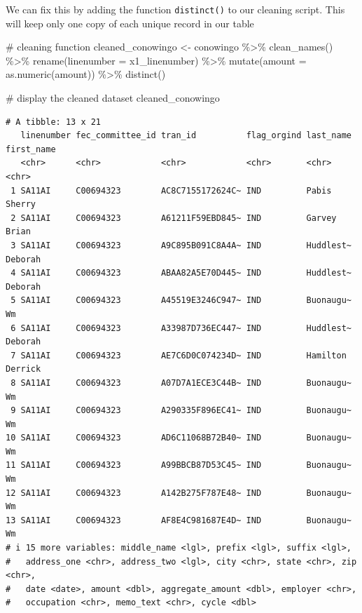 \documentclass[
  letterpaper,
  DIV=11,
  numbers=noendperiod]{scrreprt}
\newenvironment{Shaded}{\begin{snugshade}}{\end{snugshade}}
\newcommand{\AttributeTok}[1]{\textcolor[rgb]{0.40,0.45,0.13}{#1}}
\newcommand{\CommentTok}[1]{\textcolor[rgb]{0.37,0.37,0.37}{#1}}
\newcommand{\FunctionTok}[1]{\textcolor[rgb]{0.28,0.35,0.67}{#1}}
\newcommand{\NormalTok}[1]{\textcolor[rgb]{0.00,0.23,0.31}{#1}}
\newcommand{\OtherTok}[1]{\textcolor[rgb]{0.00,0.23,0.31}{#1}}
\newcommand{\SpecialCharTok}[1]{\textcolor[rgb]{0.37,0.37,0.37}{#1}}
\begin{document}
We can fix this by adding the function \texttt{distinct()} to our
cleaning script. This will keep only one copy of each unique record in
our table

\begin{Shaded}
\begin{Highlighting}[]
\CommentTok{\# cleaning function}
\NormalTok{cleaned\_conowingo }\OtherTok{\textless{}{-}}\NormalTok{ conowingo }\SpecialCharTok{\%\textgreater{}\%}
  \FunctionTok{clean\_names}\NormalTok{() }\SpecialCharTok{\%\textgreater{}\%}
  \FunctionTok{rename}\NormalTok{(}\AttributeTok{linenumber =}\NormalTok{ x1\_linenumber) }\SpecialCharTok{\%\textgreater{}\%}
  \FunctionTok{mutate}\NormalTok{(}\AttributeTok{amount =} \FunctionTok{as.numeric}\NormalTok{(amount)) }\SpecialCharTok{\%\textgreater{}\%}
  \FunctionTok{distinct}\NormalTok{()}


\CommentTok{\# display the cleaned dataset}
\NormalTok{cleaned\_conowingo}
\end{Highlighting}
\end{Shaded}

\begin{verbatim}
# A tibble: 13 x 21
   linenumber fec_committee_id tran_id          flag_orgind last_name first_name
   <chr>      <chr>            <chr>            <chr>       <chr>     <chr>     
 1 SA11AI     C00694323        AC8C7155172624C~ IND         Pabis     Sherry    
 2 SA11AI     C00694323        A61211F59EBD845~ IND         Garvey    Brian     
 3 SA11AI     C00694323        A9C895B091C8A4A~ IND         Huddlest~ Deborah   
 4 SA11AI     C00694323        ABAA82A5E70D445~ IND         Huddlest~ Deborah   
 5 SA11AI     C00694323        A45519E3246C947~ IND         Buonaugu~ Wm        
 6 SA11AI     C00694323        A33987D736EC447~ IND         Huddlest~ Deborah   
 7 SA11AI     C00694323        AE7C6D0C074234D~ IND         Hamilton  Derrick   
 8 SA11AI     C00694323        A07D7A1ECE3C44B~ IND         Buonaugu~ Wm        
 9 SA11AI     C00694323        A290335F896EC41~ IND         Buonaugu~ Wm        
10 SA11AI     C00694323        AD6C11068B72B40~ IND         Buonaugu~ Wm        
11 SA11AI     C00694323        A99BBCB87D53C45~ IND         Buonaugu~ Wm        
12 SA11AI     C00694323        A142B275F787E48~ IND         Buonaugu~ Wm        
13 SA11AI     C00694323        AF8E4C981687E4D~ IND         Buonaugu~ Wm        
# i 15 more variables: middle_name <lgl>, prefix <lgl>, suffix <lgl>,
#   address_one <chr>, address_two <lgl>, city <chr>, state <chr>, zip <chr>,
#   date <date>, amount <dbl>, aggregate_amount <dbl>, employer <chr>,
#   occupation <chr>, memo_text <chr>, cycle <dbl>
\end{verbatim}
\end{document}
